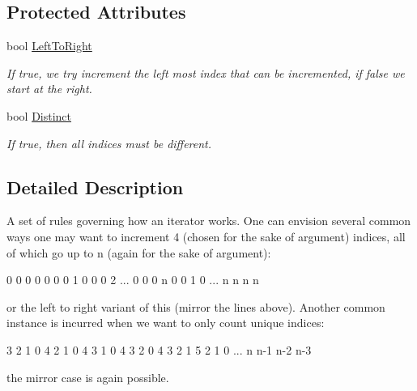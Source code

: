 \subsection*{Protected Attributes}
\begin{DoxyCompactItemize}
\item 
bool \hyperlink{classJKBuilder_1_1IteratorRules_afa98914b6f51cb9bd2eafa7c01a614e5}{LeftToRight}
\begin{DoxyCompactList}\small\item\em If true, we try increment the left most index that can be incremented, if false we start at the right. \item\end{DoxyCompactList}\item 
bool \hyperlink{classJKBuilder_1_1IteratorRules_a3cb2f931e32ad7450b106c2137dc5b7f}{Distinct}
\begin{DoxyCompactList}\small\item\em If true, then all indices must be different. \item\end{DoxyCompactList}\end{DoxyCompactItemize}


\subsection{Detailed Description}
A set of rules governing how an iterator works. One can envision several common ways one may want to increment 4 (chosen for the sake of argument) indices, all of which go up to n (again for the sake of argument):

0 0 0 0 0 0 0 1 0 0 0 2 ... 0 0 0 n 0 0 1 0 ... n n n n

or the left to right variant of this (mirror the lines above). Another common instance is incurred when we want to only count unique indices:

3 2 1 0 4 2 1 0 4 3 1 0 4 3 2 0 4 3 2 1 5 2 1 0 ... n n-\/1 n-\/2 n-\/3

the mirror case is again possible. 

